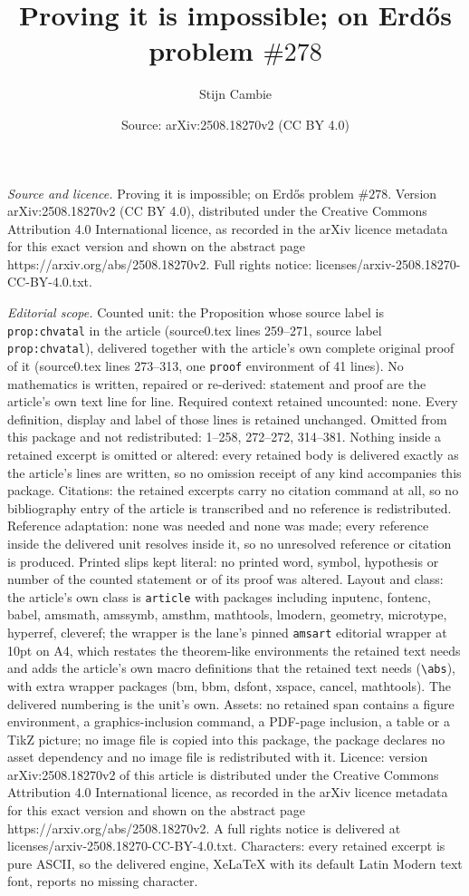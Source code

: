 \documentclass[10pt,a4paper]{amsart}
\title[Proving it is impossible; on Erd\H{o}s problem $\# 278$]{Proving it is impossible; on Erd\H{o}s problem $\# 278$}
\author{Stijn Cambie}
\date{Source: arXiv:2508.18270v2 (CC BY 4.0)}
\begin{document}
\maketitle

\noindent\emph{Source and licence.} Proving it is impossible; on Erd\H{o}s problem $\# 278$. Version arXiv:2508.18270v2 (CC BY 4.0), distributed under the Creative Commons Attribution 4.0 International licence, as recorded in the arXiv licence metadata for this exact version and shown on the abstract page https://arxiv.org/abs/2508.18270v2. Full rights notice: licenses/arxiv-2508.18270-CC-BY-4.0.txt.\par\smallskip

\noindent\textit{Editorial scope.} Counted unit: the Proposition whose source label is \texttt{prop:chvatal} in the article (source0.tex lines 259--271, source label \texttt{prop:chvatal}), delivered together with the article's own complete original proof of it (source0.tex lines 273--313, one \texttt{proof} environment of 41 lines). No mathematics is written, repaired or re-derived: statement and proof are the article's own text line for line. Required context retained uncounted: none. Every definition, display and label of those lines is retained unchanged. Omitted from this package and not redistributed: 1--258, 272--272, 314--381. Nothing inside a retained excerpt is omitted or altered: every retained body is delivered exactly as the article's lines are written, so no omission receipt of any kind accompanies this package. Citations: the retained excerpts carry no citation command at all, so no bibliography entry of the article is transcribed and no reference is redistributed. Reference adaptation: none was needed and none was made; every reference inside the delivered unit resolves inside it, so no unresolved reference or citation is produced. Printed slips kept literal: no printed word, symbol, hypothesis or number of the counted statement or of its proof was altered. Layout and class: the article's own class is \texttt{article} with packages including inputenc, fontenc, babel, amsmath, amssymb, amsthm, mathtools, lmodern, geometry, microtype, hyperref, cleveref; the wrapper is the lane's pinned \texttt{amsart} editorial wrapper at 10pt on A4, which restates the theorem-like environments the retained text needs and adds the article's own macro definitions that the retained text needs (\texttt{\textbackslash abs}), with extra wrapper packages (bm, bbm, dsfont, xspace, cancel, mathtools). The delivered numbering is the unit's own. Assets: no retained span contains a figure environment, a graphics-inclusion command, a PDF-page inclusion, a table or a TikZ picture; no image file is copied into this package, the package declares no asset dependency and no image file is redistributed with it. Licence: version arXiv:2508.18270v2 of this article is distributed under the Creative Commons Attribution 4.0 International licence, as recorded in the arXiv licence metadata for this exact version and shown on the abstract page https://arxiv.org/abs/2508.18270v2. A full rights notice is delivered at licenses/arxiv-2508.18270-CC-BY-4.0.txt. Characters: every retained excerpt is pure ASCII, so the delivered engine, XeLaTeX with its default Latin Modern text font, reports no missing character.
\end{document}
